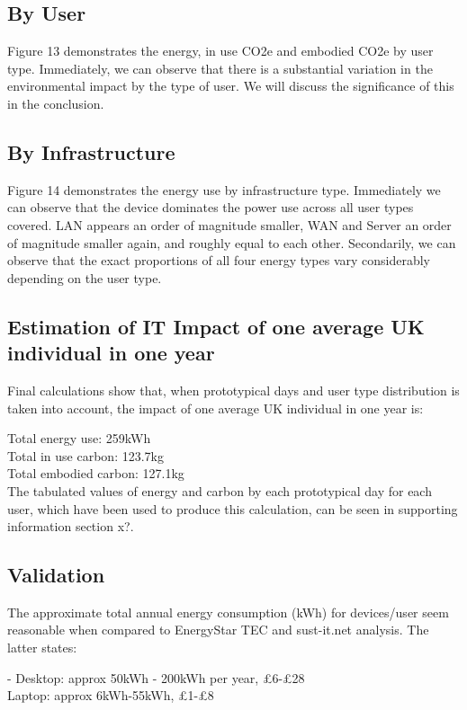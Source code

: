 \documentclass[conference]{IEEEtran}
\begin{document}
\subsection{By User}

Figure 13 demonstrates the energy, in use CO2e and embodied CO2e by user type.
Immediately, we can observe that there is a substantial variation in
the environmental impact by the type of user. We will discuss the
significance of this in the conclusion.

\subsection{By Infrastructure}

Figure 14 demonstrates the energy use by infrastructure type.
Immediately we can observe that the device dominates the power use
across all user types covered. LAN appears an order of magnitude
smaller, WAN and Server an order of magnitude smaller again, and
roughly equal to each other. Secondarily, we can observe that the
exact proportions of all four energy types vary considerably depending
on the user type.

\subsection{Estimation of IT Impact of one average UK individual in
  one year}

Final calculations show that, when prototypical days and user type
distribution is taken into account, the impact of one average UK
individual in one year is:

Total energy use: 259kWh\\
Total in use carbon: 123.7kg\\
Total embodied carbon: 127.1kg\\

The tabulated values of energy and carbon by each prototypical day for
each user, which have been used to produce this calculation, can be
seen in supporting information section x?.

\subsection{Validation}

The approximate total annual energy consumption (kWh) for devices/user
seem reasonable when compared to EnergyStar TEC and sust-it.net
analysis. The latter states:

- Desktop: approx 50kWh - 200kWh per year, \pounds 6-\pounds 28\\
Laptop: approx 6kWh-55kWh, \pounds 1-\pounds 8\\
\end{document}
